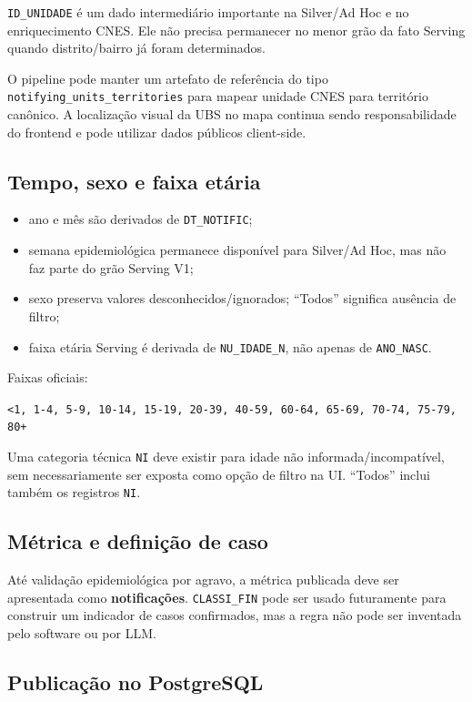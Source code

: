 \texttt{ID\_UNIDADE} é um dado intermediário importante na Silver/Ad Hoc e no enriquecimento CNES. Ele não precisa permanecer no menor grão da fato Serving quando distrito/bairro já foram determinados.

O pipeline pode manter um artefato de referência do tipo \texttt{notifying\_units\_territories} para mapear unidade CNES para território canônico. A localização visual da UBS no mapa continua sendo responsabilidade do frontend e pode utilizar dados públicos client-side.

\subsection{Tempo, sexo e faixa etária}

\begin{itemize}
    \item ano e mês são derivados de \texttt{DT\_NOTIFIC};
    \item semana epidemiológica permanece disponível para Silver/Ad Hoc, mas não faz parte do grão Serving V1;
    \item sexo preserva valores desconhecidos/ignorados; ``Todos'' significa ausência de filtro;
    \item faixa etária Serving é derivada de \texttt{NU\_IDADE\_N}, não apenas de \texttt{ANO\_NASC}.
\end{itemize}

Faixas oficiais:

\begin{center}
\texttt{<1, 1-4, 5-9, 10-14, 15-19, 20-39, 40-59, 60-64, 65-69, 70-74, 75-79, 80+}
\end{center}

Uma categoria técnica \texttt{NI} deve existir para idade não informada/incompatível, sem necessariamente ser exposta como opção de filtro na UI. ``Todos'' inclui também os registros \texttt{NI}.

\subsection{Métrica e definição de caso}

Até validação epidemiológica por agravo, a métrica publicada deve ser apresentada como \textbf{notificações}. \texttt{CLASSI\_FIN} pode ser usado futuramente para construir um indicador de casos confirmados, mas a regra não pode ser inventada pelo software ou por LLM.

\subsection{Publicação no PostgreSQL}

